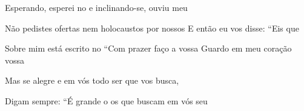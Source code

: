 \begin{greenumerate}
  \item {}Esperando, esperei no  e inclinando-se, ouviu meu 

  \item {}Não pedistes ofertas nem  holocaustos por nossos  E então eu vos disse: ``Eis que 

  \item {}Sobre mim está escrito no  ``Com prazer faço a vossa  Guardo em meu coração vossa 

  \item {}Mas se alegre e em vós  todo ser que vos busca, 

  \item {}Digam sempre: ``É grande o  os que buscam em vós seu 
\end{greenumerate}